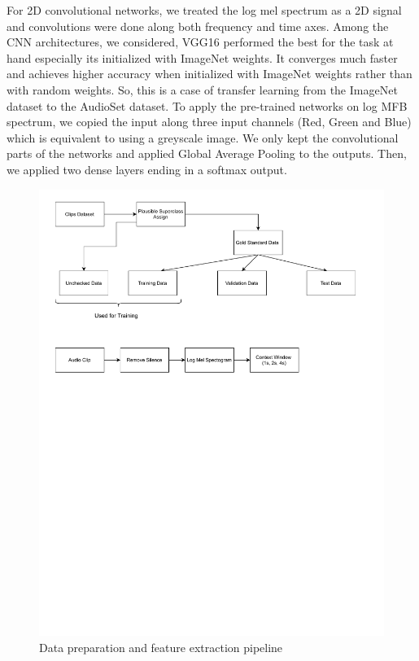 \documentclass{article}
\begin{document}
For 2D convolutional networks, we treated the log mel spectrum as a 2D signal and convolutions were done along both frequency and time axes. Among the CNN architectures, we considered, VGG16 \cite{Simonyan2014} performed the best for the task at hand especially its initialized with ImageNet weights. It converges much faster and achieves higher accuracy when initialized with ImageNet weights rather than with random weights. So, this is a case of transfer learning \cite{Oquab2014} from the ImageNet dataset to the AudioSet dataset.
To apply the pre-trained networks on log MFB spectrum, we copied the input along three input channels (Red, Green and Blue) which is equivalent to using a greyscale image. We only kept the convolutional parts of the networks and applied Global Average Pooling to the outputs. Then, we applied two dense layers ending in a softmax output.
\begin{figure}[!t]
	\centering
	\includegraphics[width=\textwidth, trim= 0 450 0 0, clip]{Pipeline.pdf}
	\caption{Data preparation and feature extraction pipeline}
	\label{fig:pipeline}
\end{figure}
\end{document}
